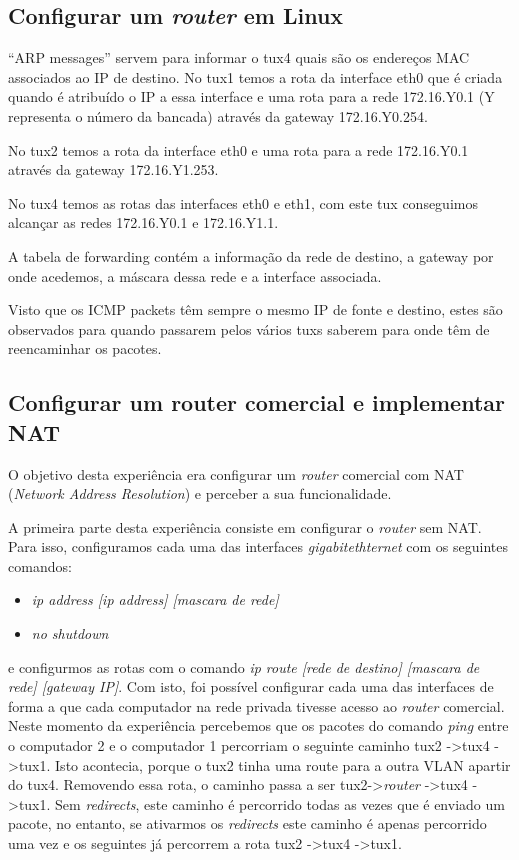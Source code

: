 \documentclass[a4paper]{article}
\begin{document}
\subsection{Configurar um \textit{router} em Linux}
“ARP messages” servem para informar o tux4 quais são os endereços MAC associados ao IP de destino.  
No tux1 temos a rota da interface eth0 que é criada quando é atribuído o IP a essa interface e uma rota para a rede 172.16.Y0.1 (Y representa o número da bancada) através da gateway 172.16.Y0.254.

No tux2 temos a rota da interface eth0 e uma rota para a rede 172.16.Y0.1 através da gateway 172.16.Y1.253.

No tux4 temos as rotas das interfaces eth0 e eth1, com este tux conseguimos alcançar as redes 172.16.Y0.1 e 172.16.Y1.1.

A tabela de forwarding contém a informação da rede de destino, a gateway por onde acedemos, a máscara dessa rede e a interface associada.

Visto que os ICMP packets têm sempre o mesmo IP de fonte e destino, estes são observados para quando passarem pelos vários tuxs saberem para onde têm de reencaminhar os pacotes.

\subsection{Configurar um router comercial e implementar NAT}

O objetivo desta experiência era configurar um \textit{router} comercial com NAT (\textit{Network Address Resolution}) e perceber a sua funcionalidade.

A primeira parte desta experiência consiste em configurar o \textit{router} sem NAT. Para isso, configuramos cada uma das interfaces \textit{gigabitethternet} com os seguintes comandos:
\begin{itemize}
	\item \textit{ip address [ip address] [mascara de rede]}
	\item \textit{no shutdown}
\end{itemize}
e configurmos as rotas com o comando \textit{ip route [rede de destino] [mascara de rede] [gateway IP]}. Com isto, foi possível configurar cada uma das interfaces de forma a que cada computador na rede privada tivesse acesso ao \textit{router} comercial. Neste momento da experiência percebemos que os pacotes do comando \textit{ping} entre o computador 2 e o computador 1 percorriam o seguinte caminho tux2 -\textgreater tux4 -\textgreater tux1. Isto acontecia, porque o tux2 tinha uma route para a outra VLAN apartir do tux4. Removendo essa rota, o caminho passa a ser tux2-\textgreater \textit{router} -\textgreater tux4 -\textgreater tux1. Sem \textit{redirects}, este caminho é percorrido todas as vezes que é enviado um pacote, no entanto, se ativarmos os \textit{redirects} este caminho é apenas percorrido uma vez e os seguintes já percorrem a rota tux2 -\textgreater tux4 -\textgreater tux1.
\end{document}
